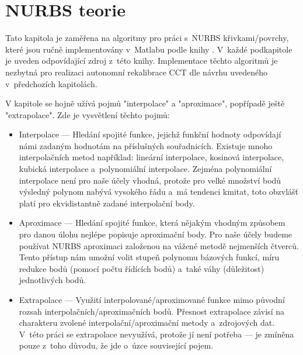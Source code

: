 \section{NURBS teorie}\label{section: NURBS teorie}
Tato kapitola je zaměřena na algoritmy pro práci s~NURBS křivkami/povrchy, které jsou ručně implementovány v~Matlabu podle knihy \cite{The_NURBS_Book}. V~každé podkapitole je uveden odpovídající zdroj z~této knihy. Implementace těchto algoritmů je nezbytná pro realizaci autonomní rekalibrace CCT dle návrhu uvedeného v~předchozích kapitolách.
\par
V kapitole se hojně užívá pojmů "interpolace" a "aproximace", popřípadě ještě "extrapolace". Zde je vysvětlení těchto pojmů:
\begin{itemize}
    \item Interpolace --- Hledání spojité funkce, jejichž funkční hodnoty odpovídají námi zadaným hodnotám na příslušných souřadnicích. Existuje mnoho interpolačních metod například: lineární interpolace, kosinová interpolace, kubická interpolace a~polynomiální interpolace. Zejména polynomiální interpolace není pro naše účely vhodná, protože pro velké množství bodů výsledný polynom nabývá vysokého řádu a~má tendenci kmitat, toto obzvlášť platí pro ekvidistantně zadané interpolační body.
    \item Aproximace --- Hledání spojité funkce, která nějakým vhodným způsobem pro danou úlohu nejlépe popisuje aproximační body. Pro naše účely budeme používat NURBS aproximaci založenou na vážené metodě nejmenších čtverců. Tento přístup nám umožní volit stupeň polynomu bázových funkcí, míru redukce bodů (pomocí počtu řídících bodů) a~také váhy (důležitost) jednotlivých bodů.
    \item Extrapolace --- Využití interpolované/aproximované funkce mimo původní rozsah interpolačních/aproximačních bodů. Přesnost extrapolace závisí na charakteru zvolené interpolační/aproximační metody a~zdrojových dat. V~této práci se extrapolace nevyužívá, protože jí není potřeba --- je zmíněna pouze z~toho důvodu, že jde o~úzce související pojem.
\end{itemize}